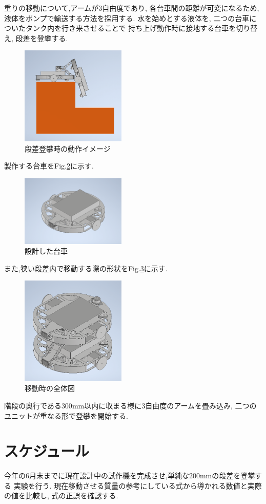 \documentclass[dvipdfmx]{jsarticle}
\begin{document}
重りの移動について,アームが3自由度であり,
各台車間の距離が可変になるため,液体をポンプで輸送する方法を採用する.
水を始めとする液体を,
二つの台車についたタンク内を行き来させることで
持ち上げ動作時に接地する台車を切り替え,
段差を登攀する.
\begin{figure}[H]
\centering
\includegraphics[width=50mm]{image/small_moment}
\caption{段差登攀時の動作イメージ}
\label{fig:model02}
\end{figure}
製作する台車をFig.\ref*{fig:CAD}に示す.
\begin{figure}[H]
\centering
\includegraphics[width=50mm]{image/1unit.png}
\caption{設計した台車}
\label{fig:CAD}
\end{figure}
また,狭い段差内で移動する際の形状をFig.\ref*{fig:move}に示す.

\begin{figure}[H]
\centering
\includegraphics[width=50mm]{image/kasane.png}
\caption{移動時の全体図}
\label{fig:move}
\end{figure}

階段の奥行である$300\mathrm{mm}$以内に収まる様に3自由度のアームを畳み込み,
二つのユニットが重なる形で登攀を開始する.
\section{スケジュール}
今年の6月末までに現在設計中の試作機を完成させ,単純な$200\mathrm{mm}$の段差を登攀する
実験を行う.
現在移動させる質量の参考にしている式から導かれる数値と実際の値を比較し,
式の正誤を確認する.
\end{document}
